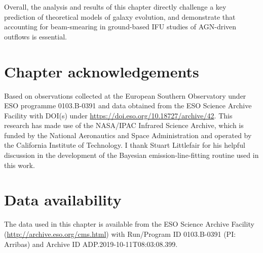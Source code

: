Overall, the analysis and results of this chapter directly challenge a key prediction of theoretical models of galaxy evolution, and demonstrate that accounting for beam-smearing in ground-based IFU studies of AGN-driven outflows is essential.

\section*{Chapter acknowledgements}

Based on observations collected at the European Southern Observatory under ESO programme 0103.B-0391 and data obtained from the ESO Science Archive Facility with DOI(s) under \url{https://doi.eso.org/10.18727/archive/42}. This research has made use of the NASA/IPAC Infrared Science Archive, which is funded by the National Aeronautics and Space Administration and operated by the California Institute of Technology. I thank Stuart Littlefair for his helpful discussion in the development of the Bayesian emission-line-fitting routine used in this work.

\section*{Data availability}

The data used in this chapter is available from the ESO Science Archive Facility (\url{http://archive.eso.org/cms.html}) with Run/Program ID 0103.B-0391 (PI: Arribas) and Archive ID ADP.2019-10-11T08:03:08.399.